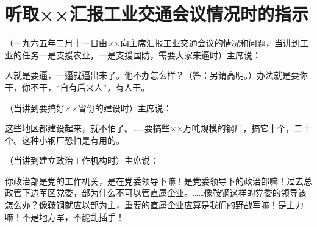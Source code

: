 \section[听取××汇报工业交通会议情况时的指示（一九六五年二月十一日）]{听取××汇报工业交通会议情况时的指示}


（一九六五年二月十一日由××向主席汇报工业交通会议的情况和问题，当讲到工业的任务一是支援农业，一是支援国防，需要大家来逼时）主席说：

人就是要逼，一逼就逼出来了。他不办怎么样？（答：另请高明。）办法就是要你干，你不干，“自有后来人”，有人干。

（当讲到要搞好××省份的建设时）主席说：

这些地区都建设起来，就不怕了。……要搞些××万吨规模的钢厂，搞它十个，二十个。这种小钢厂恐怕是有用的。

（当讲到建立政治工作机构时）主席说：

你政治部是党的工作机关，是在党委领导下嘛！是党委领导下的政治部嘛！过去总政管下边军区党委，部为什么不可以管直属企业。……像鞍钢这样的党委的领导该怎么办？像鞍钢就应以部为主，重要的直属企业应算是我们的野战军嘛！是主力嘛！不是地方军，不能乱插手！

